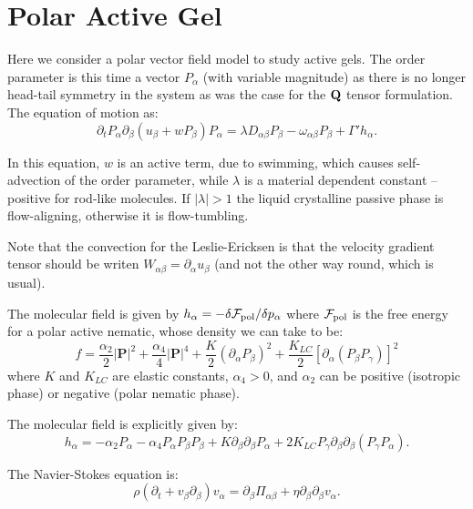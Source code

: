 \section{Polar Active Gel}


Here we consider a polar vector field model to study active gels. 
The order parameter is this time a vector $P_\alpha$
(with variable magnitude) as there is no longer head-tail symmetry
in the system as was the case for the ${\bf Q}$ tensor formulation. 
The equation of motion as:
\begin{equation}
\partial_t P_\alpha  \partial_\beta (u_{\beta} + wP_{\beta}) P_{\alpha}
= \lambda D_{\alpha\beta} P_{\beta} - \omega_{\alpha\beta} P_{\beta}
+\Gamma' h_{\alpha}.
\end{equation}

In this equation, $w$ is an active term, due to swimming, which causes
self-advection of the order parameter, while $\lambda$ is a material
dependent constant -- positive for rod-like molecules. If $|\lambda|>1$
the liquid crystalline passive phase is flow-aligning, otherwise it is
flow-tumbling. 

Note that the convection for the Leslie-Ericksen is that the
velocity gradient tensor should be writen $W_{\alpha\beta}
= \partial_\alpha u_\beta$ (and not the other way round, which
is usual).

The molecular field is given by
$h_{\alpha}=-\delta {\cal F}_{\rm pol}/\delta p_{\alpha}$
where ${\cal F}_{\rm pol}$ is the free energy for a polar active nematic,
whose density we can take to be:
\begin{equation}
f =  \frac{\alpha_2}{2} |{\mathbf P}|^2 + \frac{\alpha_4}{4}|{\mathbf P}|^4
+ \frac{K}{2}\left(\partial_\alpha P_{\beta}\right)^2 + 
\frac{K_{LC}}{2}\left[\partial_\alpha (P_{\beta}P_{\gamma})\right]^2 
\end{equation}
where $K$ and $K_{LC}$ are elastic constants, $\alpha_4>0$, and $\alpha_2$ 
can be positive (isotropic phase) or negative (polar nematic phase).

The molecular field is explicitly given by:
\begin{equation}
h_{\alpha}=-\alpha_2 P_{\alpha} -\alpha_4 P_{\alpha} P_{\beta}P_{\beta}+
K \partial_{\beta}\partial_{\beta} P_{\alpha}+2 K_{LC}
P_{\gamma}\partial_{\beta}\partial_{\beta} (P_{\gamma}P_{\alpha}).
\end{equation}


The Navier-Stokes equation is:
\begin{equation}
\rho \left(\partial_t+v_{\beta}\partial_{\beta}\right) v_{\alpha} =
\partial_{\beta} \Pi_{\alpha\beta} 
+\eta \partial_{\beta}\partial_{\beta} v_{\alpha}.
\end{equation}


